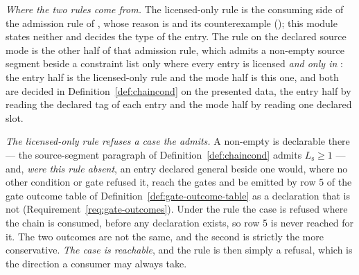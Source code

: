 \begin{remark}\label{rem:source-segment-rules}
\emph{Where the two rules come from.} The licensed-only rule is the consuming
side of the admission rule of , whose reason is
 and its counterexample
(); this module states neither and decides the
type of the entry. The rule on the declared source mode is the other half of
that admission rule, which admits a non-empty source segment beside a
constraint list only where every entry is licensed \emph{and only in
}: the entry half is the licensed-only rule and the
mode half is this one, and both are decided in
Definition~\ref{def:chaincond} on the presented data, the entry half by
reading the declared tag of each entry and the mode half by reading one
declared slot.

\emph{The licensed-only rule refuses a case the  admits.}
A non-empty  is declarable there --- the source-segment
paragraph of Definition~\ref{def:chaincond} admits $L_{\mathrm s}\ge1$ ---
and, \emph{were this rule absent}, an entry declared general beside one
would, where no other condition or gate refused it, reach the gates and be
emitted by row 5 of the gate outcome table of
Definition~\ref{def:gate-outcome-table} as a
declaration that is not 
(Requirement~\ref{req:gate-outcomes}). Under the rule the case is refused where the
chain is consumed, before any declaration exists, so row 5 is never reached
for it. The two outcomes are not the same, and the second is strictly the more
conservative. \emph{The case is reachable}, and the rule is then simply a
refusal, which is the direction a consumer may always take.


\end{remark}
